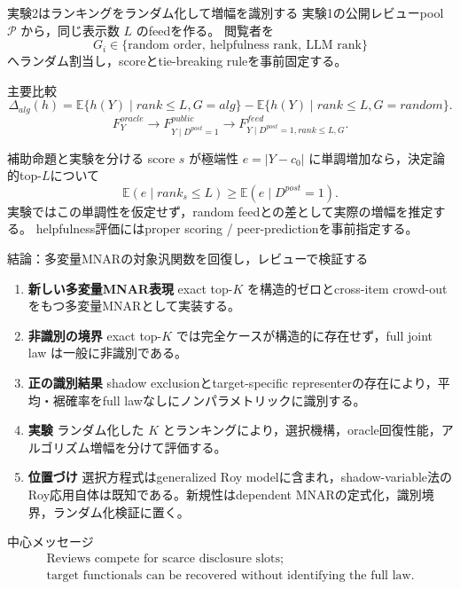\documentclass[aspectratio=169,10pt]{beamer}
\newcommand{\E}{\mathbb{E}}
\newcommand{\1}{\mathbf{1}}
\begin{document}
\begin{frame}[shrink=7]{実験2はランキングをランダム化して増幅を識別する}
実験1の公開レビューpool $\mathcal P$ から，同じ表示数 $L$ のfeedを作る。
閲覧者を
\[
G_i\in\{\text{random order},\ \text{helpfulness rank},\ \text{LLM rank}\}
\]
へランダム割当し，scoreとtie-breaking ruleを事前固定する。
\begin{block}{主要比較}
\[
\Delta_{alg}(h)
=
\E\{h(Y)\mid rank\le L,G=alg\}
-
\E\{h(Y)\mid rank\le L,G=random\}.
\]
\[
F_Y^{oracle}
\longrightarrow
F_{Y\mid D^{post}=1}^{public}
\longrightarrow
F_{Y\mid D^{post}=1,rank\le L,G}^{feed}.
\]
\end{block}
\begin{alertblock}{補助命題と実験を分ける}
score $s$ が極端性 $e=|Y-c_0|$ に単調増加なら，決定論的top-$L$について
\[
\E(e\mid rank_s\le L)\ge\E(e\mid D^{post}=1).
\]
実験ではこの単調性を仮定せず，random feedとの差として実際の増幅を推定する。
helpfulness評価にはproper scoring / peer-predictionを事前指定する。
\end{alertblock}
\end{frame}

\begin{frame}[shrink=6]{結論：多変量MNARの対象汎関数を回復し，レビューで検証する}
\begin{enumerate}
\item \textbf{新しい多変量MNAR表現}\quad
exact top-$K$ を構造的ゼロとcross-item crowd-outをもつ多変量MNARとして実装する。
\item \textbf{非識別の境界}\quad
exact top-$K$ では完全ケースが構造的に存在せず，full joint law は一般に非識別である。
\item \textbf{正の識別結果}\quad
shadow exclusionとtarget-specific representerの存在により，平均・裾確率をfull lawなしにノンパラメトリックに識別する。
\item \textbf{実験}\quad
ランダム化した $K$ とランキングにより，選択機構，oracle回復性能，アルゴリズム増幅を分けて評価する。
\item \textbf{位置づけ}\quad
選択方程式はgeneralized Roy modelに含まれ，shadow-variable法のRoy応用自体は既知である。新規性はdependent MNARの定式化，識別境界，ランダム化検証に置く。
\end{enumerate}
\begin{alertblock}{中心メッセージ}
\[
\begin{gathered}
\text{Reviews compete for scarce disclosure slots;}\\
\text{target functionals can be recovered without identifying the full law.}
\end{gathered}
\]
\end{alertblock}
\end{frame}
\end{document}
